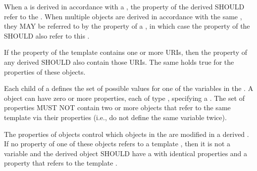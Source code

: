 When a  is derived in accordance with a , the  property of the derived  SHOULD refer to the . When multiple  objects are derived in accordance with the same , they MAY be referred to by the  property of a , in which case the  property of the  SHOULD also refer to this .

If the  property of the template  contains one or more URIs, then the  property of any derived  SHOULD also contain those URIs. 
The same holds true for the  properties of these  objects.

\label{sec:hasVariableFeature}

Each   child of a  defines the set of possible values for one of the variables in the .
A  object can have zero or more   properties, each of type , specifying a  . 
The set of   properties MUST NOT contain two or more   objects that refer to the same template   via their  properties (i.e., do not define the same variable twice).

The  properties of   objects control which   objects in the  are modified in a derived .
If no  property of one of these   objects refers to a template  , then it is not a variable and the derived object SHOULD have a   with identical properties
and a  property that refers to the template  .

